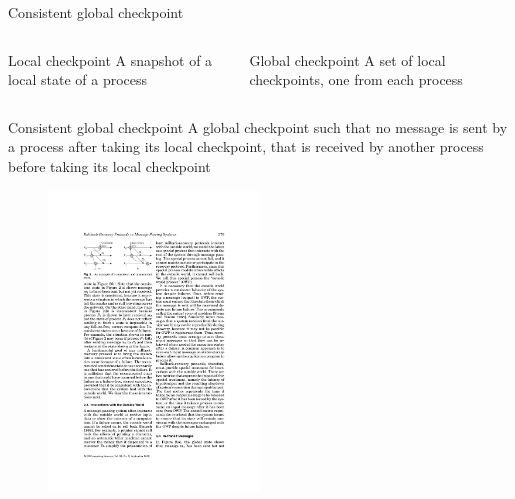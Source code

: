 \begin{frame}{Consistent global checkpoint}

\begin{columns}
\begin{column}{0.48\textwidth}
\begin{block}{\alert{Local checkpoint}}
A snapshot of a local state of a process
\end{block}
\end{column}
\begin{column}{0.48\textwidth}
\begin{block}{\alert{Global checkpoint}}
A set of local checkpoints, one from each process
\end{block}
\end{column}
\end{columns}

\begin{block}{\alert{Consistent global checkpoint}}
A global checkpoint such that no message is sent by a process after taking its
local checkpoint, that is received by another process before taking its local
checkpoint
\end{block}
\begin{figure}
	\includegraphics[width=0.5\textwidth]{consistent}
\end{figure}
\end{frame}

